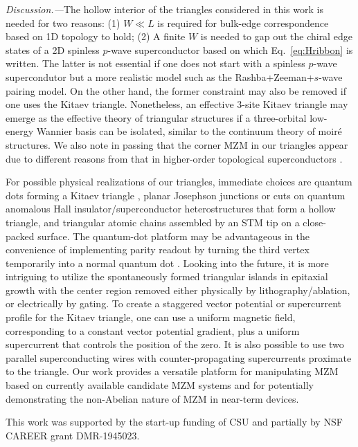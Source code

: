 \documentclass[aps,prb,twocolumn,showpacs,amsmath,amssymb,superscriptaddress]{revtex4-2}
\begin{document}
\emph{Discussion.---}The hollow interior of the triangles considered in this work is needed for two reasons: (1) $W\ll L$ is required for bulk-edge correspondence based on 1D topology to hold; (2) A finite $W$ is needed to gap out the chiral edge states of a 2D spinless $p$-wave superconductor based on which Eq.~\eqref{eq:Hribbon} is written. The latter is not essential if one does not start with a spinless $p$-wave supercondutor but a more realistic model such as the Rashba+Zeeman+$s$-wave pairing model. On the other hand, the former constraint may also be removed if one uses the Kitaev triangle. Nonetheless, an effective 3-site Kitaev triangle may emerge as the effective theory of triangular structures if a three-orbital low-energy Wannier basis can be isolated, similar to the continuum theory of moir\'{e} structures. We also note in passing that the corner MZM in our triangles appear due to different reasons from that in higher-order topological superconductors \cite{wangEvidenceMajoranaBound2018,pahomiBraidingMajoranaCorner2020,zhangsb_2020_1,zhangsb_2020_2}.

For possible physical realizations of our triangles, immediate choices are quantum dots forming a Kitaev triangle \cite{dvirRealizationMinimalKitaev2023}, planar Josephson junctions or cuts on quantum anomalous Hall insulator/superconductor heterostructures \cite{xieCreatingLocalizedMajorana2021} that form a hollow triangle, and triangular atomic chains assembled by an STM tip \cite{schneiderPrecursorsMajoranaModes2022} on a close-packed surface. The quantum-dot platform may be advantageous in the convenience of implementing parity readout by turning the third vertex temporarily into a normal quantum dot \cite{mishmashDephasingLeakageDynamics2020,parity_QD_readout_2020, fengProbingRobustMajorana2022}. Looking into the future, it is more intriguing to utilize the spontaneously formed triangular islands in epitaxial growth \cite{pietzschSpinResolvedElectronicStructure2006} with the center region removed either physically by lithography/ablation, or electrically by gating. To create a staggered vector potential or supercurrent profile for the Kitaev triangle, one can use a uniform magnetic field, corresponding to a constant vector potential gradient, plus a uniform supercurrent that controls the position of the zero. It is also possible to use two parallel superconducting wires with counter-propagating supercurrents proximate to the triangle. Our work provides a versatile platform for manipulating MZM based on currently available candidate MZM systems and for potentially demonstrating the non-Abelian nature of MZM in near-term devices.

\begin{acknowledgements}
This work was supported by the start-up funding of CSU and partially by NSF CAREER grant DMR-1945023.
\end{acknowledgements}



%
\end{document}
